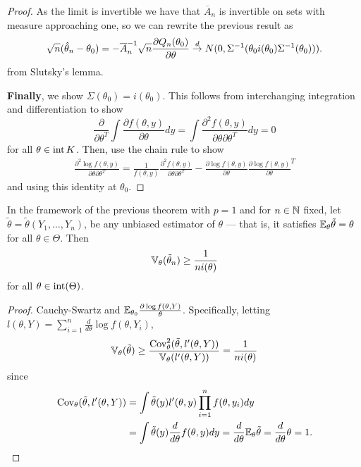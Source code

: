 \begin{proof}
  As the limit is invertible we have that $\overline A_{n}$ is
  invertible on sets with measure approaching one, so we can rewrite
  the previous result as
  \begin{align}
    \label{eq:53}
    \sqrt{n}(\hat \theta_{n} - \theta_{0}) = -\overline A_{n}^{-1}
    \sqrt{n} \frac{\partial Q_{n}(\theta_{0})}{\partial \theta} \overset{d}{\rightarrow}
    N(0, \Sigma^{-1}(\theta_{0} i(\theta_{0}) \Sigma^{-1}(\theta_{0}))).
  \end{align} from Slutsky's lemma.

  \textbf{Finally}, we show $\Sigma(\theta_{0}) = i(\theta_{0})$.
  This follows from interchanging integration and differentiation to show
  \begin{equation}
    \label{eq:54}
    \frac{\partial}{\partial \theta^{T}} \int \frac{\partial f(\theta,
      y)}{\partial \theta} dy = \int \frac{\partial^{2} f(\theta,
      y)}{\partial \theta \partial \theta^{T}} dy = 0
  \end{equation} for all $\theta \in \operatorname*{int} K$. Then, use the chain
  rule to show
  \begin{align}
    \label{eq:55}
    \frac{\partial^{2} \log f(\theta, y)}{\partial \theta \partial
      \theta^{T}}  = \frac{1}{f(\theta, y)} \frac{\partial^{2}
      f(\theta, y)}{\partial \theta \partial \theta^{T}}   -
    \frac{\partial \log f(\theta, y)}{\partial \theta}  \frac{\partial
    \log f(\theta, y)}{\partial \theta}^{T}
  \end{align} and using this identity at $\theta_{0}$.
\end{proof}

\begin{thm}
  In the framework of the previous theorem with $p=1$ and for $n \in
  \mathbb{N}$ fixed, let $\tilde \theta = \tilde \theta(Y_{1}, \dots, Y_{n})$,
  be any unbiased estimator of $\theta$ --- that is, it satisfies
  $\E_{\theta} \tilde \theta = \theta$ for all $\theta \in \Theta$.
  Then
  \begin{align}
    \label{eq:17}
    \Var_{\theta}(\tilde \theta_{n}) \geq \frac{1}{ni(\theta)}
  \end{align} for all $\theta \in \operatorname*{int}(\Theta)$.
\end{thm}

\begin{proof}
  Cauchy-Swartz and $\E_{\theta_{0}}\frac{\partial \log f(\theta,
    Y)}{\theta}$.
  Specifically, letting $l(\theta, Y) = \sum_{i=1}^{n}
  \frac{d}{d\theta} \log f(\theta, Y_{i})$,
  \begin{align}
    \label{eq:56}
    \Var_{\theta}(\tilde \theta) \geq \frac{\Cov_{\theta}^{2}(\tilde
      \theta, l'(\theta, Y))}{\Var_{\theta}(l'(\theta, Y))} =
    \frac{1}{ni(\theta)}
  \end{align} since
  \begin{align}
    \label{eq:57}
    \Cov_{\theta}(\tilde \theta, l'(\theta, Y)) &= \int \tilde
    \theta(y) l'(\theta, y) \prod_{i=1}^{n} f(\theta, y_{i}) dy \\
    &= \int \tilde \theta(y) \frac{d}{d\theta}  f(\theta, y) dy =
    \frac{d}{d\theta}  \E_{\theta} \tilde \theta = \frac{d}{d \theta}
    \theta = 1.
  \end{align}
\end{proof}

